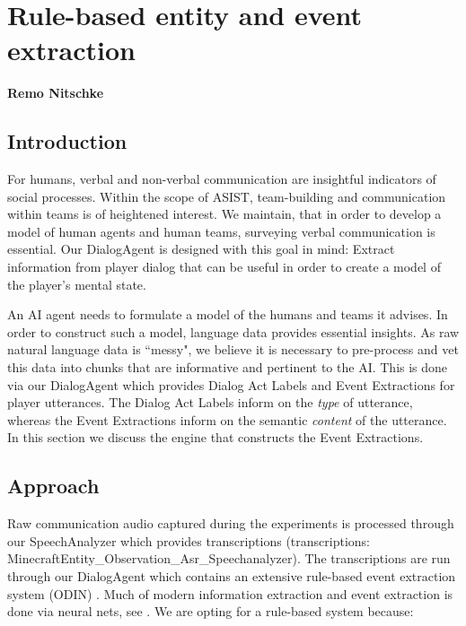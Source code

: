 \chapter{Rule-based entity and event extraction}
\label{ch:rule_based_ie}
\textbf{Remo Nitschke}

\section{Introduction}

For humans, verbal and non-verbal communication are insightful indicators of
social processes. Within the scope of ASIST, team-building and communication
within teams is of heightened interest. We maintain, that in order to develop a
model of human agents and human teams, surveying verbal communication is
essential. Our DialogAgent is designed with this goal in mind: Extract
information from player dialog that can be useful in order to create a model of
the player's mental state.

An AI agent needs to formulate a model of the humans and teams it advises. In
order to construct such a model, language data provides essential insights. As
raw natural language data is ``messy", we believe it is necessary to
pre-process and vet this data into chunks that are informative and pertinent to
the AI. This is done via our DialogAgent which provides Dialog Act Labels and
Event Extractions for player utterances. The Dialog Act Labels inform on the
\emph{type} of utterance, whereas the Event Extractions inform on the semantic
\emph{content} of the utterance. In this section we discuss the engine that
constructs the Event Extractions.

\section{Approach}


Raw communication audio captured during the experiments is processed through
our SpeechAnalyzer which provides transcriptions (transcriptions:
MinecraftEntity\_Observation\_Asr\_Speechanalyzer). The transcriptions are run through our DialogAgent which contains an extensive rule-based event extraction system (ODIN) \citep{valenzuela-escarcega-etal-2016-odins}. Much of modern information extraction and event extraction is done via neural nets, see \citet{Ahmad2021GATEGA,Du2020EventEB}. We are opting for a rule-based system because:


